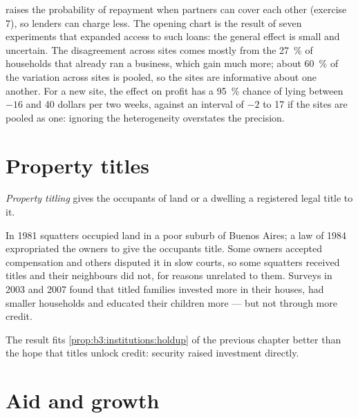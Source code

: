  raises the probability of repayment when partners can cover each
other (exercise 7), so lenders can charge less. The opening chart is the result of
seven experiments that expanded access to such loans: the general effect is small
and uncertain. The disagreement across sites comes mostly from the 27~\% of households that already ran a
business, which gain much more; about 60~\% of the variation across sites is pooled, so the sites are
informative about one another. %
For a new site, the effect on profit has a 95~\% chance of lying between $-16$ and 40 dollars per two weeks, against an interval of
$-2$ to 17 if the sites are pooled as one: ignoring the heterogeneity overstates the precision. %

\section{Property titles}\label{sec:b3:development-microeconomics:titles}

\begin{definition}\label{def:b3:development-microeconomics:titling}
\emph{Property titling} gives the occupants of land or a dwelling a registered legal
title to it.
\end{definition}

\begin{record}
In 1981 squatters occupied land in a poor suburb of Buenos Aires; a law of 1984 expropriated the owners to
give the occupants title. Some owners accepted compensation and others disputed it
in slow courts, so some squatters received titles and their neighbours did not, for
reasons unrelated to them. Surveys in 2003 and 2007 found that titled families invested more in their
houses, had smaller households and educated their children more --- but not through
more credit. %
\end{record}

The result fits \cref{prop:b3:institutions:holdup} of the previous chapter better
than the hope that titles unlock credit: security raised investment directly.

\section{Aid and growth}\label{sec:b3:development-microeconomics:aid}


